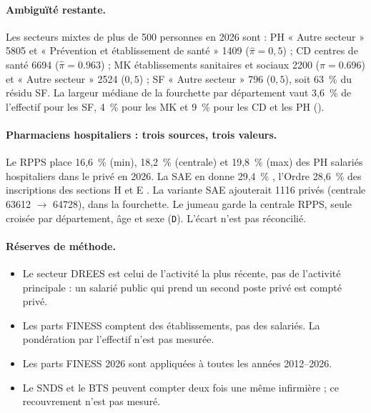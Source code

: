 \paragraph{Ambiguïté restante.} Les secteurs mixtes de plus de 500\mesure{} personnes en 2026 sont :
PH « Autre secteur » \num{5805}\mesure{} et « Prévention et établissement de santé » \num{1409}\mesure{}
($\hat\pi = 0{,}5$\suppose) ; CD centres de santé \num{6694}\mesure{} ($\hat\pi = \num{0.963}$\mesure) ; MK
établissements sanitaires et sociaux \num{2200}\mesure{} ($\hat\pi = \num{0.696}$\mesure) et « Autre secteur »
\num{2524}\mesure{} ($0{,}5$\suppose) ; SF « Autre secteur » \num{796}\mesure{} ($0{,}5$\suppose), soit
63~\%\derive{} du résidu SF. La largeur médiane de la fourchette par département vaut 3,6~\%\mesure{} de
l'effectif pour les SF, 4~\%\mesure{} pour les MK et 9~\%\mesure{} pour les CD et les PH ().

\paragraph{Pharmaciens hospitaliers : trois sources, trois valeurs.} Le RPPS place 16,6~\%\mesure{} (min),
18,2~\%\mesure{} (centrale) et 19,8~\%\mesure{} (max) des PH salariés hospitaliers dans le privé en 2026. La SAE
en donne 29,4~\%\mesure{} \citep{d-sae708}, l'Ordre 28,6~\%\derive{} des inscriptions des sections H et E
\citep{d-cnop2025}. La variante SAE ajouterait \num{1116}\derive{} privés (centrale \num{63612} $\to$
\num{64728}\derive), dans la fourchette. Le jumeau garde la centrale RPPS, seule croisée par département, âge et
sexe (\texttt{D}). L'écart n'est pas réconcilié.

\paragraph{Réserves de méthode.}
\begin{itemize}
  \item Le secteur DREES est celui de l'activité la plus récente, pas de l'activité principale
  \citep{d-drees2026demo} : un salarié public qui prend un second poste privé est compté privé.
  \item Les parts FINESS comptent des établissements, pas des salariés. La pondération par l'effectif n'est
  pas mesurée.
  \item Les parts FINESS 2026 sont appliquées à toutes les années 2012--2026\suppose.
  \item Le SNDS et le BTS peuvent compter deux fois une même infirmière ; ce recouvrement n'est pas mesuré.
\end{itemize}

